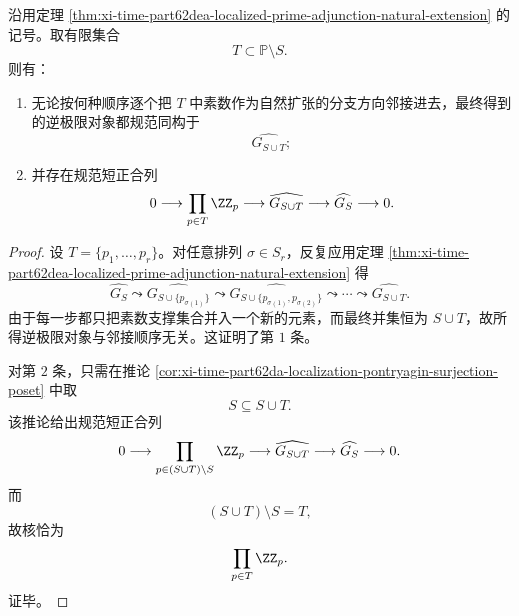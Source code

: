 \begin{corollary}\label{cor:xi-time-part62dea-prime-adjunction-order-independent-kernel-product}
沿用定理 \ref{thm:xi-time-part62dea-localized-prime-adjunction-natural-extension} 的记号。取有限集合
\[
T\subset \mathbb P\setminus S.
\]
则有：
\begin{enumerate}
  \item 无论按何种顺序逐个把 \(T\) 中素数作为自然扩张的分支方向邻接进去，最终得到的逆极限对象都规范同构于
  \[
  \widehat{G_{S\cup T}};
  \]
  \item 并存在规范短正合列
  \[
  0\longrightarrow \prod_{p\in T}\ZZ_p
  \longrightarrow \widehat{G_{S\cup T}}
  \longrightarrow \widehat{G_S}
  \longrightarrow 0.
  \]
\end{enumerate}
\end{corollary}
\begin{proof}
设 \(T=\{p_1,\dots,p_r\}\)。对任意排列 \(\sigma\in S_r\)，反复应用定理 \ref{thm:xi-time-part62dea-localized-prime-adjunction-natural-extension} 得
\[
\widehat{G_S}
\leadsto
\widehat{G_{S\cup\{p_{\sigma(1)}\}}}
\leadsto
\widehat{G_{S\cup\{p_{\sigma(1)},p_{\sigma(2)}\}}}
\leadsto \cdots \leadsto
\widehat{G_{S\cup T}}.
\]
由于每一步都只把素数支撑集合并入一个新的元素，而最终并集恒为 \(S\cup T\)，故所得逆极限对象与邻接顺序无关。这证明了第 \(1\) 条。

对第 \(2\) 条，只需在推论 \ref{cor:xi-time-part62da-localization-pontryagin-surjection-poset} 中取
\[
S\subseteq S\cup T.
\]
该推论给出规范短正合列
\[
0\longrightarrow \prod_{p\in (S\cup T)\setminus S}\ZZ_p
\longrightarrow \widehat{G_{S\cup T}}
\longrightarrow \widehat{G_S}
\longrightarrow 0.
\]
而
\[
(S\cup T)\setminus S=T,
\]
故核恰为
\[
\prod_{p\in T}\ZZ_p.
\]
证毕。
\end{proof}

